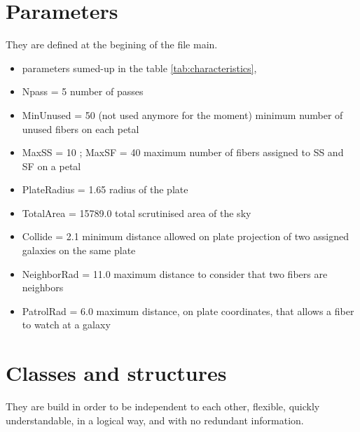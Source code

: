 \documentclass[10pt]{extarticle}
\begin{document}
\begin{multicols}{2}
\section{Parameters}
They are defined at the begining of the file main.
\begin{itemize} 
	\item parameters sumed-up in the table \ref{tab:characteristics},
	\item Npass = 5 number of passes
	\item MinUnused = 50 (not used anymore for the moment) minimum number of unused fibers on each petal
	\item MaxSS = 10 ; MaxSF = 40 maximum number of fibers assigned to SS and SF on a petal
	\item PlateRadius = 1.65 radius of the plate
	\item TotalArea = 15789.0 total scrutinised area of the sky
	\item Collide = 2.1 minimum distance allowed on plate projection of two assigned galaxies on the same plate
	\item NeighborRad = 11.0 maximum distance to consider that two fibers are neighbors
	\item PatrolRad = 6.0 maximum distance, on plate coordinates, that allows a fiber to watch at a galaxy
\end{itemize} 


\section{Classes and structures}
They are build in order to be independent to each other, flexible, quickly understandable, in a logical way, and with no redundant information.

\end{multicols}
\end{document}
